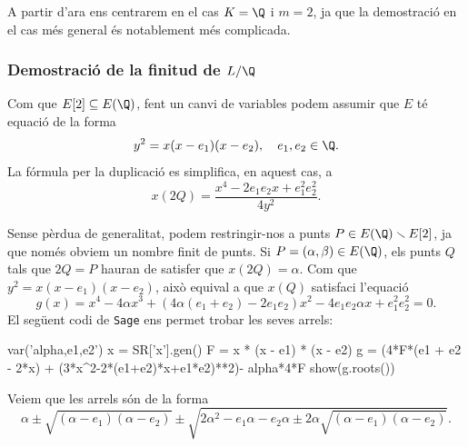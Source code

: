 %

A partir d'ara ens centrarem en el cas $K=\Q$ i $m=2$, ja que la demostració en el cas més general és notablement més complicada.

\subsubsection{Demostració de la finitud de \texorpdfstring{$L/\Q$}{L/Q}}
 Com que $E[2]\subseteq E(\Q)$, fent un canvi de variables podem assumir que $E$ té equació de la forma
 \[
 y^2 = x (x-e_1)(x-e_2),\quad e_1,e_2\in\Q.
 \]
 La fórmula per la duplicació es simplifica, en aquest cas, a
 \[
 x(2Q) = \frac{x^4-2e_1e_2x + e_1^2e_2^2}{4y^2}.
 \]
 
 Sense pèrdua de generalitat, podem restringir-nos a punts $P\in E(\Q)\setminus E[2]$, ja que només obviem un nombre finit de punts. Si $P=(\alpha,\beta)\in E(\Q)$, els punts $Q$ tals que $2Q=P$ hauran de satisfer que $x(2Q)=\alpha$. Com que $y^2=x(x-e_1)(x-e_2)$, això equival a que $x(Q)$ satisfaci l'equació
 \[
 g(x) = x^4 - 4\alpha x^3 +
 (4\alpha(e_1+e_2)-2e_1e_2)x^2-4e_1e_2\alpha x + e_1^2e_2^2= 0.
 \]
 El següent codi de \texttt{Sage} ens permet trobar les seves arrels:
 \begin{python}
 var('alpha,e1,e2')
 x = SR['x'].gen()
 F = x * (x - e1) * (x - e2)
 g = (4*F*(e1 + e2 - 2*x) + (3*x^2-2*(e1+e2)*x+e1*e2)**2)- alpha*4*F
 show(g.roots())
 \end{python}
 Veiem que les arrels són de la forma
 \[
 \alpha \pm \sqrt{(\alpha-e_1)(\alpha-e_2)} \pm \sqrt{2\alpha^2-e_1\alpha-e_2\alpha \pm 2\alpha\sqrt{(\alpha-e_1)(\alpha-e_2)}}.
 \]
 
